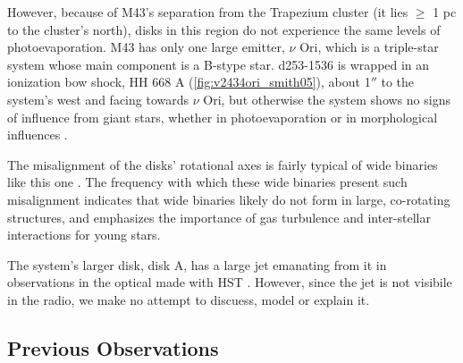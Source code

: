 \begin{figure}[htp]
  \hspace*{\fill}%
  \hfill%
  \hspace*{\fill}%
  \label{fig:onc_disk_relations}
\end{figure}


However, because of M43's separation from the Trapezium cluster (it lies $\geq$ 1 pc to the cluster's north), disks in this region do not experience the same levels of photoevaporation. M43 has only one large emitter, $\nu$ Ori, which is a triple-star system whose main component is a B-stype star. d253-1536 is wrapped in an ionization bow shock, HH 668 A (\ref{fig:v2434ori_smith05}), about 1$''$ to the system's west and facing towards $\nu$ Ori, but otherwise the system shows no signs of influence from giant stars, whether in photoevaporation or in morphological influences \citep{MannWilliams2009}.

The misalignment of the disks' rotational axes is fairly typical of wide binaries like this one \citep{Williams2014}. The frequency with which these wide binaries present such misalignment indicates that wide binaries likely do not form in large, co-rotating structures, and emphasizes the importance of gas turbulence and inter-stellar interactions for young stars.


The system's larger disk, disk A, has a large jet emanating from it in observations in the optical made with HST \citep{Smith2005}. However, since the jet is not visibile in the radio, we make no attempt to discuess, model or explain it.



\subsection{Previous Observations}

